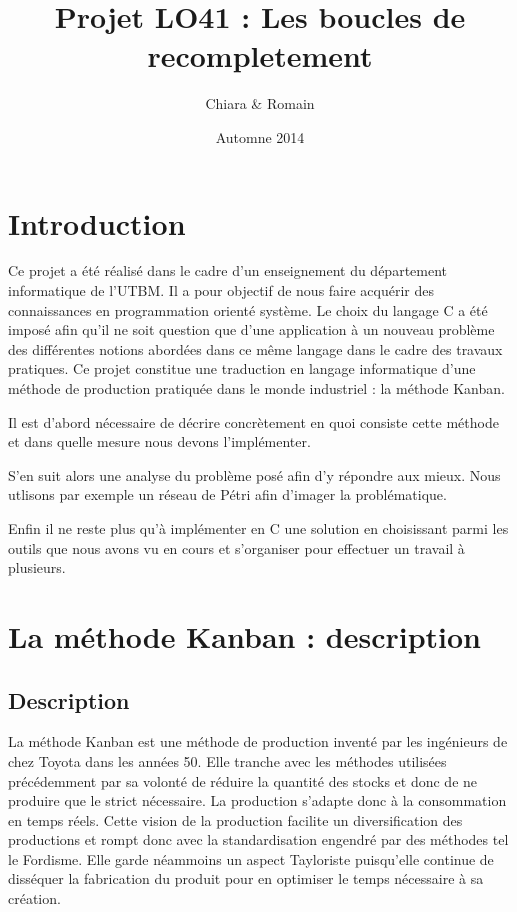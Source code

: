 \documentclass[11pt]{report}
\title{ Projet LO41 : Les boucles de recompletement}
\author{Chiara \bsc{Salvoni} \& Romain \bsc{Thibaud}}
\date{Automne 2014}
\begin{document}
\maketitle

\tableofcontents

\chapter{Introduction}

Ce projet a été réalisé dans le cadre d'un enseignement du département informatique de l'UTBM. Il a pour objectif de nous faire acquérir des connaissances en programmation orienté système. Le choix du langage C a été imposé afin qu'il ne soit question que d'une application à un nouveau problème des différentes notions abordées dans ce même langage dans le cadre des travaux pratiques. Ce projet constitue une traduction en langage informatique d'une méthode de production pratiquée dans le monde industriel : la méthode Kanban. 

Il est d'abord nécessaire de décrire concrètement en quoi consiste cette méthode et dans quelle mesure nous devons l'implémenter. 

S'en suit alors une analyse du problème posé afin d'y répondre aux mieux. Nous utlisons par exemple un réseau de Pétri afin d'imager la problématique. 

Enfin il ne reste plus qu'à implémenter en C une solution en choisissant parmi les outils que nous avons vu en cours et s'organiser pour effectuer un travail à plusieurs.

\chapter{La méthode Kanban : description}

	\section{Description}
	
	La méthode Kanban est une méthode de production inventé par les ingénieurs de chez Toyota dans les années 50. Elle tranche avec les méthodes utilisées précédemment par sa volonté de réduire la quantité des stocks et donc de ne produire que le strict nécessaire. La production s'adapte donc à la consommation en temps réels. Cette vision de la production facilite un diversification des productions et rompt donc avec la standardisation engendré par des méthodes tel le Fordisme. Elle garde néammoins un aspect Tayloriste puisqu'elle continue de disséquer la fabrication du produit pour en optimiser le temps nécessaire à sa création.
	
\end{document}
